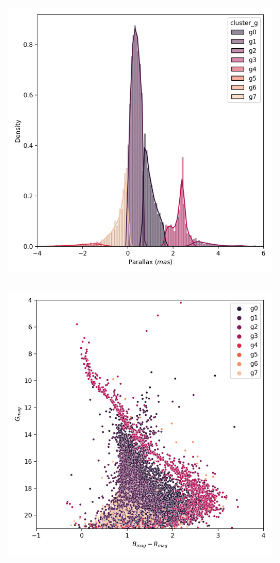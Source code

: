 \documentclass[11pt, a4paper, english]{book}
\begin{document}
\begin{figure}[H]
\begin{subfigure}{0.9\textwidth}
\begin{subfigure}[t]{0.30\textwidth}
    \end{subfigure}
    \hfill
    \begin{subfigure}[t]{0.30\textwidth}
      \centering
      \includegraphics[width=\textwidth]{../figures/ngc_2516/kmeans_parallax_ngc_2516.png}
    \end{subfigure}
    \hfill
    \begin{subfigure}[t]{0.30\textwidth}
      \centering
      \includegraphics[width=\textwidth]{../figures/ngc_2516/kmeans_hr_diagram_ngc_2516.png}

\end{subfigure}
\end{subfigure}
\end{figure}
\end{document}
